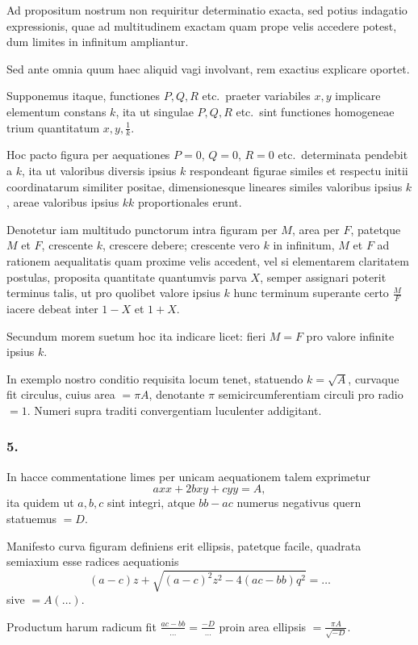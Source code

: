 \documentclass[12pt,a4paper]{article}
\begin{document}
Ad propositum nostrum non requiritur determinatio exacta, sed potius indagatio expressionis, quae ad multitudinem exactam quam prope velis accedere potest, dum limites in infinitum ampliantur.

Sed ante omnia quum haec aliquid vagi involvant, rem exactius explicare oportet.

Supponemus itaque, functiones $P, Q, R$ etc.\ praeter variabiles $x, y$ implicare elementum constans $k$, ita ut singulae $P, Q, R$ etc.\ sint functiones homogeneae trium quantitatum $x, y, \frac{1}{k}$.

Hoc pacto figura per aequationes $P=0$, $Q=0$, $R=0$ etc.\ determinata pendebit a $k$, ita ut valoribus diversis ipsius $k$ respondeant figurae similes et respectu initii coordinatarum similiter positae, dimensionesque lineares similes valoribus ipsius $k$, areae valoribus ipsius $kk$ proportionales erunt.

Denotetur iam multitudo punctorum intra figuram per $M$, area per $F$, patetque $M$ et $F$, crescente $k$, crescere debere; crescente vero $k$ in infinitum, $M$ et $F$ ad rationem aequalitatis quam proxime velis accedent, vel si elementarem claritatem postulas, proposita quantitate quantumvis parva $X$, semper assignari poterit terminus talis, ut pro quolibet valore ipsius $k$ hunc terminum superante certo $\frac{M}{F}$ iacere debeat inter $1-X$ et $1+X$.

Secundum morem suetum hoc ita indicare licet: fieri $M=F$ pro valore infinite ipsius $k$.

In exemplo nostro conditio requisita locum tenet, statuendo $k=\sqrt{A}$, curvaque fit circulus, cuius area $=\pi A$, denotante $\pi$ semicircumferentiam circuli pro radio $=1$. Numeri supra traditi convergentiam luculenter addigitant.

\subsubsection*{5.}

In hacce commentatione limes per unicam aequationem talem exprimetur
\[
axx + 2bxy + cyy = A,
\]
ita quidem ut $a, b, c$ sint integri, atque $bb-ac$ numerus negativus quern statuemus $=D$.

Manifesto curva figuram definiens erit ellipsis, patetque facile, quadrata semiaxium esse radices aequationis
\[
(a-c)z + \sqrt{(a-c)^2z^2 - 4(ac-bb)q^2} = \ldots
\]
sive $= A(\ldots)$.

Productum harum radicum fit $\frac{ac-bb}{\ldots} = \frac{-D}{\ldots}$ proin area ellipsis $= \frac{\pi A}{\sqrt{-D}}$.
\end{document}
